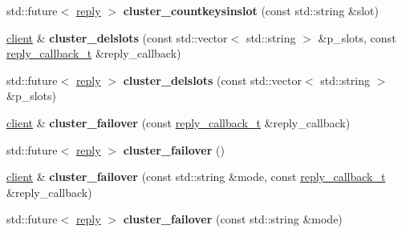 \begin{DoxyCompactItemize}
std\+::future$<$ \mbox{\hyperlink{classcpp__redis_1_1reply}{reply}} $>$ {\bfseries cluster\+\_\+countkeysinslot} (const std\+::string \&slot)
\item 
\mbox{\label{classcpp__redis_1_1client_a41f96bb9a627724570f1866d0983d7b2}} 
\mbox{\hyperlink{classcpp__redis_1_1client}{client}} \& {\bfseries cluster\+\_\+delslots} (const std\+::vector$<$ std\+::string $>$ \&p\+\_\+slots, const \mbox{\hyperlink{classcpp__redis_1_1client_af7a65eb21aa25230bfbb0b0203c4fc04}{reply\+\_\+callback\+\_\+t}} \&reply\+\_\+callback)
\item 
\mbox{\label{classcpp__redis_1_1client_a6cd07520f60ee78c4603211273adcf46}} 
std\+::future$<$ \mbox{\hyperlink{classcpp__redis_1_1reply}{reply}} $>$ {\bfseries cluster\+\_\+delslots} (const std\+::vector$<$ std\+::string $>$ \&p\+\_\+slots)
\item 
\mbox{\label{classcpp__redis_1_1client_a5afcee001e210150803a95c3d6412998}} 
\mbox{\hyperlink{classcpp__redis_1_1client}{client}} \& {\bfseries cluster\+\_\+failover} (const \mbox{\hyperlink{classcpp__redis_1_1client_af7a65eb21aa25230bfbb0b0203c4fc04}{reply\+\_\+callback\+\_\+t}} \&reply\+\_\+callback)
\item 
\mbox{\label{classcpp__redis_1_1client_a76122bb138c12b90c78c4e511f45ef17}} 
std\+::future$<$ \mbox{\hyperlink{classcpp__redis_1_1reply}{reply}} $>$ {\bfseries cluster\+\_\+failover} ()
\item 
\mbox{\label{classcpp__redis_1_1client_a9c95de64e422c09c2180dc69db386d06}} 
\mbox{\hyperlink{classcpp__redis_1_1client}{client}} \& {\bfseries cluster\+\_\+failover} (const std\+::string \&mode, const \mbox{\hyperlink{classcpp__redis_1_1client_af7a65eb21aa25230bfbb0b0203c4fc04}{reply\+\_\+callback\+\_\+t}} \&reply\+\_\+callback)
\item 
\mbox{\label{classcpp__redis_1_1client_a06f9c7d27f961787b01a01be95f1fa29}} 
std\+::future$<$ \mbox{\hyperlink{classcpp__redis_1_1reply}{reply}} $>$ {\bfseries cluster\+\_\+failover} (const std\+::string \&mode)
\item 
\mbox{\label{classcpp__redis_1_1client_aea8a77acb9031fd03f8ab5dc2c09a17d}} 

\end{DoxyCompactItemize}
